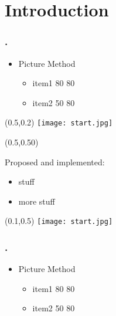 \documentclass[12pt,t]{beamer}
\begin{document}
\section{Introduction}
\begin{frame}
\frametitle{\thesection.~\insertsection}
\begin{itemize}
\item Picture Method
\begin{itemize}
\item item1 80 80 
\item item2 50 80
\end{itemize}
\end{itemize}

\begin{textblock*}{0.45\textwidth}(0.5\textwidth,0.2\textheight)
\texttt{[image: start.jpg]}
\end{textblock*}

\begin{textblock*}{0.45\textwidth}(0.5\textwidth,0.50\textheight)
\begin{exampleblock}{}
  Proposed and implemented:
  \begin{itemize}
    \item stuff
    \item more stuff
  \end{itemize}
\end{exampleblock}
\end{textblock*}

\begin{textblock*}{0.45\textwidth}(0.1\textwidth,0.5\textheight)
\texttt{[image: start.jpg]}
\end{textblock*}

\end{frame}




\begin{frame}
\frametitle{\thesection.~\insertsection}
\begin{itemize}
\item Picture Method
\begin{itemize}
\item item1 80 80 
\item item2 50 80
\end{itemize}
\end{itemize}
\end{frame}
\end{document}

